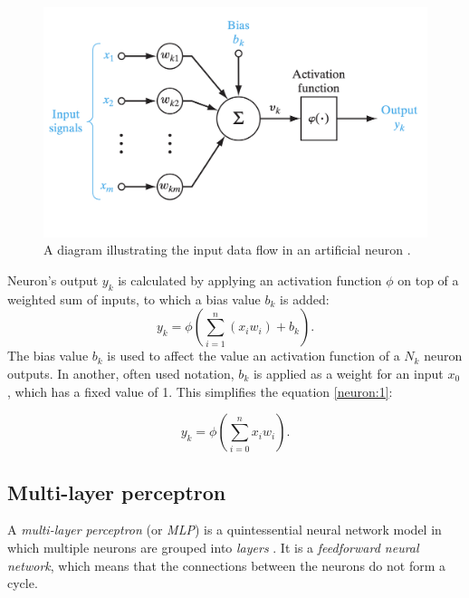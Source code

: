 \begin{figure}[]
\centering
\includegraphics[scale=0.45]{figures/neuron.png}
\caption{A diagram illustrating the input data flow in an artificial neuron \cite{haykin_nn}.}
\end{figure}
Neuron's output $y_k$ is calculated by applying an activation function $\phi$ on top of a weighted sum of inputs, to which a bias value $b_k$ is added:
\begin{equation}
\label{neuron:1}
y_k = \phi(\sum_{i=1}^n (x_iw_i) + b_k).
\end{equation}
The bias value $b_k$ is used to affect the value an activation function of a $N_k$ neuron outputs. In another, often used notation, $b_k$ is applied as a weight for an input $x_0$, which has a fixed value of 1. This simplifies the equation \ref{neuron:1}:

\begin{equation}
\label{neuron:2}
y_k = \phi(\sum_{i=0}^n x_iw_i).
\end{equation}


\subsection{Multi-layer perceptron}

A \emph{multi-layer perceptron} (or \emph{MLP}) is a quintessential neural network model in which multiple neurons are grouped into \emph{layers} \cite{goodfellow}. It is a \emph{feedforward neural network}, which means that the connections between the neurons do not form a cycle.

